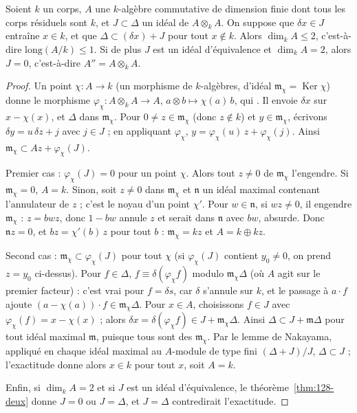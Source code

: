 \begin{encadre}
\begin{theoreme}\label{thm:128-colongueur}
Soient $k$ un corps, $A$ une $k$-algèbre commutative de dimension finie dont tous les corps résiduels sont $k$, et $J \subset \Delta$ un idéal de $A \otimes_k A$. On suppose que $\delta x \in J$ entraîne $x \in k$, et que $\Delta \subset (\delta x) + J$ pour tout $x \notin k$. Alors $\dim_k A \leq 2$, c'est-à-dire $\mathrm{long}(A/k) \leq 1$. Si de plus $J$ est un idéal d'équivalence et $\dim_k A = 2$, alors $J = 0$, c'est-à-dire $A'' = A \otimes_k A$.
\end{theoreme}
\end{encadre}

\begin{proof}
Un point $\chi : A \to k$ (un morphisme de $k$-algèbres, d'idéal $\mathfrak m_\chi = \operatorname{Ker} \chi$) donne le morphisme $\varphi_\chi : A \otimes_k A \to A$, $a \otimes b \mapsto \chi(a)\, b$, qui . Il envoie $\delta x$ sur $x - \chi(x)$, et $\Delta$ dans $\mathfrak m_\chi$. Pour $0 \neq z \in \mathfrak m_\chi$ (donc $z \notin k$) et $y \in \mathfrak m_\chi$, écrivons $\delta y = u\, \delta z + j$ avec $j \in J$ ; en appliquant $\varphi_\chi$, $y = \varphi_\chi(u)\, z + \varphi_\chi(j)$. Ainsi $\mathfrak m_\chi \subset A z + \varphi_\chi(J)$.

Premier cas : $\varphi_\chi(J) = 0$ pour un point $\chi$. Alors tout $z \neq 0$ de $\mathfrak m_\chi$ l'engendre. Si $\mathfrak m_\chi = 0$, $A = k$. Sinon, soit $z \neq 0$ dans $\mathfrak m_\chi$ et $\mathfrak n$ un idéal maximal contenant l'annulateur de $z$ ; c'est le noyau d'un point $\chi'$. Pour $w \in \mathfrak n$, si $wz \neq 0$, il engendre $\mathfrak m_\chi$ : $z = bwz$, donc $1 - bw$ annule $z$ et serait dans $\mathfrak n$ avec $bw$, absurde. Donc $\mathfrak n z = 0$, et $bz = \chi'(b)\, z$ pour tout $b$ : $\mathfrak m_\chi = kz$ et $A = k \oplus kz$.

Second cas : $\mathfrak m_\chi \subset \varphi_\chi(J)$ pour tout $\chi$ (si $\varphi_\chi(J)$ contient $y_0 \neq 0$, on prend $z = y_0$ ci-dessus). Pour $f \in \Delta$, $f \equiv \delta(\varphi_\chi f)$ modulo $\mathfrak m_\chi \Delta$ (où $A$ agit sur le premier facteur) : c'est vrai pour $f = \delta s$, car $\delta$ s'annule sur $k$, et le passage à $a \cdot f$ ajoute $(a - \chi(a)) \cdot f \in \mathfrak m_\chi \Delta$. Pour $x \in A$, choisissons $f \in J$ avec $\varphi_\chi(f) = x - \chi(x)$ ; alors $\delta x = \delta(\varphi_\chi f) \in J + \mathfrak m_\chi \Delta$. Ainsi $\Delta \subset J + \mathfrak m \Delta$ pour tout idéal maximal $\mathfrak m$, puisque tous sont des $\mathfrak m_\chi$. Par le lemme de Nakayama, appliqué en chaque idéal maximal au $A$-module de type fini $(\Delta + J)/J$, $\Delta \subset J$ ; l'exactitude donne alors $x \in k$ pour tout $x$, soit $A = k$.

Enfin, si $\dim_k A = 2$ et si $J$ est un idéal d'équivalence, le théorème~\ref{thm:128-deux} donne $J = 0$ ou $J = \Delta$, et $J = \Delta$ contredirait l'exactitude.
\end{proof}

